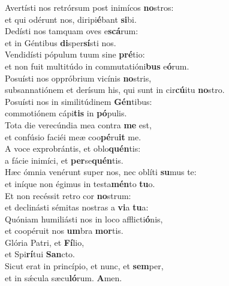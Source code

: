 \evenverse Avertísti nos retrórsum post inimícos \textbf{no}stros:~\*\\
\evenverse et qui odérunt nos, diripi\textbf{é}bant \textbf{si}bi.\\
\oddverse Dedísti nos tamquam oves e\textbf{scá}rum:~\*\\
\oddverse et in Géntibus \textbf{di}sper\textbf{sí}sti nos.\\
\evenverse Vendidísti pópulum tuum sine \textbf{pré}tio:~\*\\
\evenverse et non fuit multitúdo in commutatióni\textbf{bus} e\textbf{ó}rum.\\
\oddverse Posuísti nos oppróbrium vicínis \textbf{no}stris,~\*\\
\oddverse subsannatiónem et derísum his, qui sunt in cir\textbf{cú}itu \textbf{no}stro.\\
\evenverse Posuísti nos in similitúdinem \textbf{Gén}tibus:~\*\\
\evenverse commotiónem cápi\textbf{tis} in \textbf{pó}pulis.\\
\oddverse Tota die verecúndia mea contra \textbf{me} est,~\*\\
\oddverse et confúsio faciéi meæ coo\textbf{pé}ru\textbf{it} me.\\
\evenverse A voce exprobrántis, et oblo\textbf{quén}tis:~\*\\
\evenverse a fácie inimíci, et \textbf{per}se\textbf{quén}tis.\\
\oddverse Hæc ómnia venérunt super nos, nec oblíti \textbf{su}mus te:~\*\\
\oddverse et iníque non égimus in testa\textbf{mén}to \textbf{tu}o.\\
\evenverse Et non recéssit retro cor \textbf{no}strum:~\*\\
\evenverse et declinásti sémitas nostras a \textbf{vi}a \textbf{tu}a:\\
\oddverse Quóniam humiliásti nos in loco afflicti\textbf{ó}nis,~\*\\
\oddverse et coopéruit nos \textbf{um}bra \textbf{mor}tis.\\
\evenverse Glória Patri, et \textbf{Fí}lio,~\*\\
\evenverse et Spi\textbf{rí}tui \textbf{San}cto.\\
\oddverse Sicut erat in princípio, et nunc, et \textbf{sem}per,~\*\\
\oddverse et in sǽcula sæcu\textbf{ló}rum. \textbf{A}men.\\
